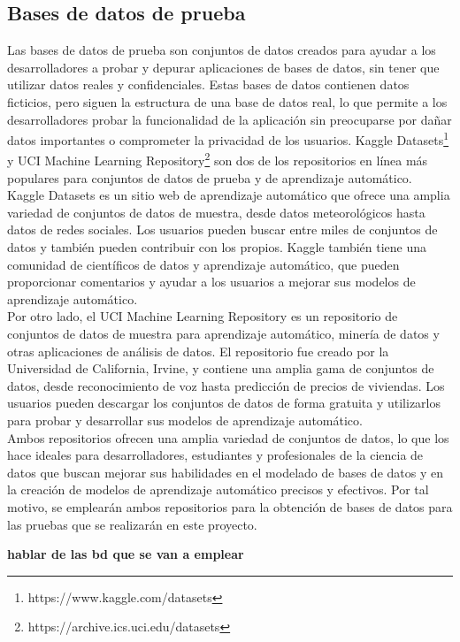 \subsection{Bases de datos de prueba}
Las bases de datos de prueba son conjuntos de datos creados para ayudar a los desarrolladores a probar y depurar aplicaciones de bases de datos, sin tener que utilizar datos reales y confidenciales. Estas bases de datos contienen datos ficticios, pero siguen la estructura de una base de datos real, lo que permite a los desarrolladores probar la funcionalidad de la aplicación sin preocuparse por dañar datos importantes o comprometer la privacidad de los usuarios. Kaggle Datasets\footnote{https://www.kaggle.com/datasets} y UCI Machine Learning Repository\footnote{https://archive.ics.uci.edu/datasets} son dos de los repositorios en línea más populares para conjuntos de datos de prueba y de aprendizaje automático. \\
Kaggle Datasets es un sitio web de aprendizaje automático que ofrece una amplia variedad de conjuntos de datos de muestra, desde datos meteorológicos hasta datos de redes sociales. Los usuarios pueden buscar entre miles de conjuntos de datos y también pueden contribuir con los propios. Kaggle también tiene una comunidad de científicos de datos y aprendizaje automático, que pueden proporcionar comentarios y ayudar a los usuarios a mejorar sus modelos de aprendizaje automático. \\
Por otro lado, el UCI Machine Learning Repository es un repositorio de conjuntos de datos de muestra para aprendizaje automático, minería de datos y otras aplicaciones de análisis de datos. El repositorio fue creado por la Universidad de California, Irvine, y contiene una amplia gama de conjuntos de datos, desde reconocimiento de voz hasta predicción de precios de viviendas. Los usuarios pueden descargar los conjuntos de datos de forma gratuita y utilizarlos para probar y desarrollar sus modelos de aprendizaje automático. \\
Ambos repositorios ofrecen una amplia variedad de conjuntos de datos, lo que los hace ideales para desarrolladores, estudiantes y profesionales de la ciencia de datos que buscan mejorar sus habilidades en el modelado de bases de datos y en la creación de modelos de aprendizaje automático precisos y efectivos. Por tal motivo, se emplearán ambos repositorios para la obtención de bases de datos para las pruebas que se realizarán en este proyecto.

\textbf{hablar de las bd que se van a emplear}

